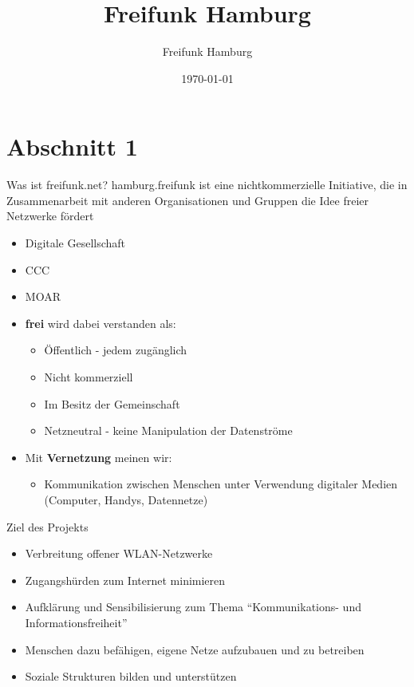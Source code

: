 \documentclass[aspectratio=43]{beamer}
\title{Freifunk Hamburg}
\author{Freifunk Hamburg}
\date{\today}
\begin{document}
\maketitle
\frame{\tableofcontents[currentsection]}

\section{Abschnitt 1}
\begin{frame}{Was ist freifunk.net?}
  hamburg.freifunk ist eine nichtkommerzielle Initiative, die in Zusammenarbeit mit anderen Organisationen und Gruppen die Idee freier Netzwerke fördert
  \begin{itemize}
	\item Digitale Gesellschaft
	\item CCC
	\item MOAR %
  \end{itemize}
\end{frame}

\begin{frame}
\begin{itemize}
	\item \textbf{frei} wird dabei verstanden als:
	\begin{itemize}
		\item Öffentlich - jedem zugänglich
		\item Nicht kommerziell
		\item Im Besitz der Gemeinschaft
		\item Netzneutral - keine Manipulation der Datenströme
	\end{itemize}
	\item Mit \textbf{Vernetzung} meinen wir:
	\begin{itemize}
		\item Kommunikation zwischen Menschen unter Verwendung digitaler Medien (Computer, Handys, Datennetze)
	\end{itemize}
  \end{itemize}
\end{frame}

\begin{frame}{Ziel des Projekts}
	\begin{itemize}
		\item Verbreitung offener WLAN-Netzwerke
		\item Zugangshürden zum Internet minimieren
		\item Aufklärung und Sensibilisierung zum Thema ``Kommunikations- und Informationsfreiheit''
		\item Menschen dazu befähigen, eigene Netze aufzubauen und zu betreiben
		\item Soziale Strukturen bilden und unterstützen %
	\end{itemize}
\end{frame}
\end{document}
